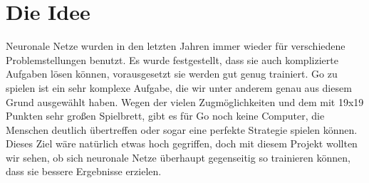 \section{Die Idee}
Neuronale Netze wurden in den letzten Jahren immer wieder für verschiedene
Problemstellungen benutzt. Es wurde festgestellt, dass sie auch komplizierte
Aufgaben lösen können, vorausgesetzt sie werden gut genug trainiert. Go zu
spielen ist ein sehr komplexe Aufgabe, die wir unter anderem genau aus diesem
Grund ausgewählt haben. Wegen der vielen Zugmöglichkeiten und dem mit 19x19
Punkten sehr großen Spielbrett, gibt es für Go noch keine Computer, die
Menschen deutlich übertreffen oder sogar eine perfekte Strategie spielen
können. Dieses Ziel wäre natürlich etwas hoch gegriffen, doch mit diesem
Projekt wollten wir sehen, ob sich neuronale Netze überhaupt gegenseitig so
trainieren können, dass sie bessere Ergebnisse erzielen.

